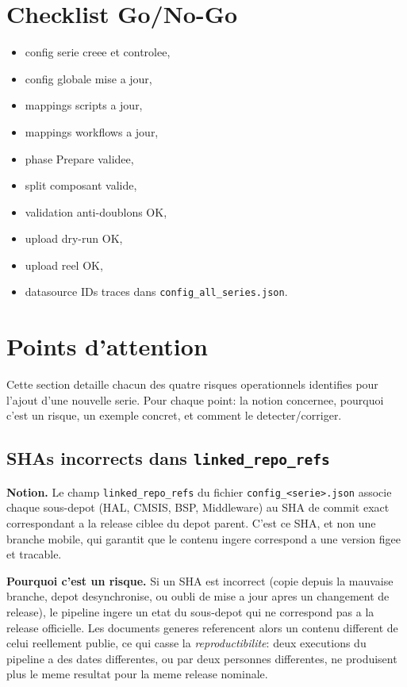 \documentclass[11pt,a4paper]{article}
\begin{document}
\section{Checklist Go/No-Go}
\begin{itemize}[leftmargin=*]
  \item config serie creee et controlee,
  \item config globale mise a jour,
  \item mappings scripts a jour,
  \item mappings workflows a jour,
  \item phase Prepare validee,
  \item split composant valide,
  \item validation anti-doublons OK,
  \item upload dry-run OK,
  \item upload reel OK,
  \item datasource IDs traces dans \texttt{config\_all\_series.json}.
\end{itemize}

\section{Points d'attention}
Cette section detaille chacun des quatre risques operationnels identifies pour
l'ajout d'une nouvelle serie. Pour chaque point: la notion concernee, pourquoi
c'est un risque, un exemple concret, et comment le detecter/corriger.

\subsection{SHAs incorrects dans \texttt{linked\_repo\_refs}}
\textbf{Notion.} Le champ \texttt{linked\_repo\_refs} du fichier
\texttt{config\_<serie>.json} associe chaque sous-depot (HAL, CMSIS, BSP,
Middleware) au SHA de commit exact correspondant a la release ciblee du depot
parent. C'est ce SHA, et non une branche mobile, qui garantit que le contenu
ingere correspond a une version figee et tracable.

\textbf{Pourquoi c'est un risque.} Si un SHA est incorrect (copie depuis la
mauvaise branche, depot desynchronise, ou oubli de mise a jour apres un
changement de release), le pipeline ingere un etat du sous-depot qui ne
correspond pas a la release officielle. Les documents generes referencent alors
un contenu different de celui reellement publie, ce qui casse la
\emph{reproductibilite}: deux executions du pipeline a des dates differentes,
ou par deux personnes differentes, ne produisent plus le meme resultat pour la
meme release nominale.
\end{document}
